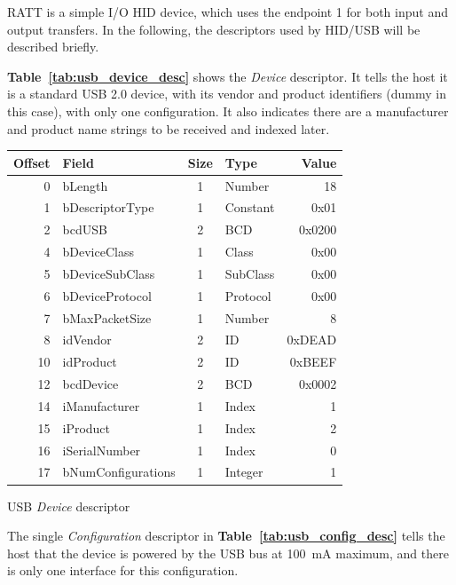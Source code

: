 \documentclass[a4paper,10pt]{article}
\makeatletter
\newenvironment{tablehere}{\def\@captype{table}\vspace{2ex}}{\vspace{2ex}}
\newcommand{\citet}[1]{\textbf{Table~\ref{#1}}}
\makeatother
\begin{document}
\begin{multicols}{2}
RATT is a simple I/O HID device, which uses the endpoint 1 for both input and
output transfers. In the following, the descriptors used by HID/USB will be
described briefly.

\citet{tab:usb_device_desc} shows the \emph{Device} descriptor. It tells the
host it is a standard USB 2.0 device, with its vendor and product identifiers
(dummy in this case), with only one configuration. It also indicates there
are a manufacturer and product name strings to be received and indexed later.

\begin{tablehere}
\centering \footnotesize
\begin{tabular}{|r|l|c|l|r|}
\hline
\textbf{Offset} & \textbf{Field} & \textbf{Size} & \textbf{Type} & \textbf{Value}	\\
\hline
0	& bLength				& 1	& Number	& 18		\\
1	& bDescriptorType		& 1	& Constant	& 0x01		\\
2	& bcdUSB				& 2	& BCD		& 0x0200	\\
4	& bDeviceClass			& 1	& Class		& 0x00		\\
5	& bDeviceSubClass		& 1	& SubClass	& 0x00		\\
6	& bDeviceProtocol		& 1	& Protocol	& 0x00		\\
7	& bMaxPacketSize		& 1	& Number	& 8			\\
8	& idVendor				& 2	& ID		& 0xDEAD	\\
10	& idProduct				& 2	& ID		& 0xBEEF	\\
12	& bcdDevice				& 2	& BCD		& 0x0002	\\
14	& iManufacturer			& 1	& Index		& 1			\\
15	& iProduct				& 1	& Index		& 2			\\
16	& iSerialNumber			& 1	& Index		& 0			\\
17	& bNumConfigurations	& 1	& Integer	& 1			\\
\hline
\end{tabular}
\caption{USB \emph{Device} descriptor}
\label{tab:usb_device_desc}
\end{tablehere}

The single \emph{Configuration} descriptor in \citet{tab:usb_config_desc}
tells the host that the device is powered by the USB bus at 100~mA maximum,
and there is only one interface for this configuration.


\end{multicols}
\end{document}
